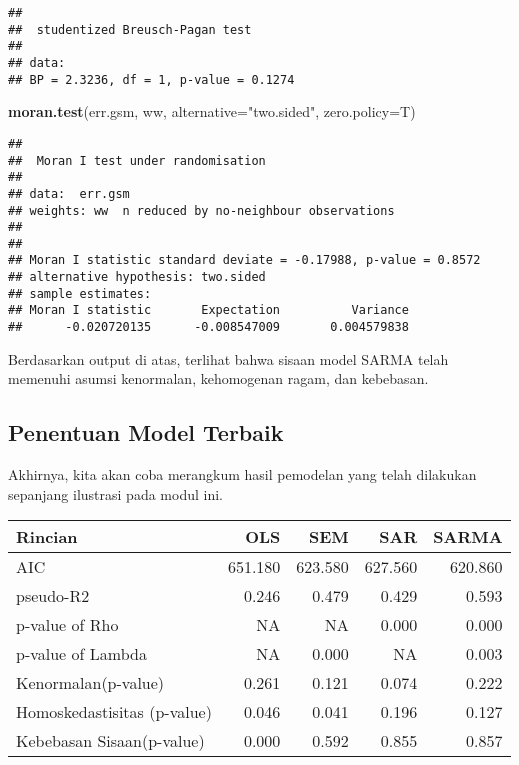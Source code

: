 \documentclass[
]{book}
\newenvironment{Shaded}{\begin{snugshade}}{\end{snugshade}}
\newcommand{\DataTypeTok}[1]{\textcolor[rgb]{0.13,0.29,0.53}{#1}}
\newcommand{\KeywordTok}[1]{\textcolor[rgb]{0.13,0.29,0.53}{\textbf{#1}}}
\newcommand{\NormalTok}[1]{#1}
\newcommand{\StringTok}[1]{\textcolor[rgb]{0.31,0.60,0.02}{#1}}
\begin{document}
\begin{verbatim}
## 
##  studentized Breusch-Pagan test
## 
## data:  
## BP = 2.3236, df = 1, p-value = 0.1274
\end{verbatim}

\begin{Shaded}
\begin{Highlighting}[]
\KeywordTok{moran.test}\NormalTok{(err.gsm, ww, }\DataTypeTok{alternative=}\StringTok{"two.sided"}\NormalTok{, }\DataTypeTok{zero.policy=}\NormalTok{T)}
\end{Highlighting}
\end{Shaded}

\begin{verbatim}
## 
##  Moran I test under randomisation
## 
## data:  err.gsm  
## weights: ww  n reduced by no-neighbour observations
##   
## 
## Moran I statistic standard deviate = -0.17988, p-value = 0.8572
## alternative hypothesis: two.sided
## sample estimates:
## Moran I statistic       Expectation          Variance 
##      -0.020720135      -0.008547009       0.004579838
\end{verbatim}

Berdasarkan output di atas, terlihat bahwa sisaan model SARMA telah memenuhi asumsi kenormalan, kehomogenan ragam, dan kebebasan.

\hypertarget{penentuan-model-terbaik}{%
\subsection{Penentuan Model Terbaik}\label{penentuan-model-terbaik}}

Akhirnya, kita akan coba merangkum hasil pemodelan yang telah dilakukan sepanjang ilustrasi pada modul ini.

\captionsetup[table]{labelformat=empty,skip=1pt}
\begin{longtable}{lrrrr}
\toprule
Rincian & OLS & SEM & SAR & SARMA \\ 
\midrule
AIC & 651.180 & 623.580 & 627.560 & 620.860 \\ 
pseudo-R2 & 0.246 & 0.479 & 0.429 & 0.593 \\ 
p-value of Rho & NA & NA & 0.000 & 0.000 \\ 
p-value of Lambda & NA & 0.000 & NA & 0.003 \\ 
Kenormalan(p-value) & 0.261 & 0.121 & 0.074 & 0.222 \\ 
Homoskedastisitas (p-value) & 0.046 & 0.041 & 0.196 & 0.127 \\ 
Kebebasan Sisaan(p-value) & 0.000 & 0.592 & 0.855 & 0.857 \\ 
\bottomrule
\end{longtable}
\end{document}
